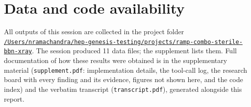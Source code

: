 \documentclass[11pt,a4paper]{article}
\begin{document}
\section*{Data and code availability}
All outputs of this session are collected in the project folder \href{file:///Users/nramachandra/hep-genesis-testing/projects/ramp-combo-sterile-bbn-xray}{\texttt{/\allowbreak{}Users/\allowbreak{}nramachandra/\allowbreak{}hep-genesis-testing/\allowbreak{}projects/\allowbreak{}ramp-combo-sterile-bbn-xray}}.
The session produced 11 data files; the supplement lists them.
Full documentation of how these results were obtained is in the supplementary material (\texttt{supplement.pdf}: implementation details, the tool-call log, the research board with every finding and its evidence, figures not shown here, and the code index) and the verbatim transcript (\texttt{transcript.pdf}), generated alongside this report.
\end{document}
